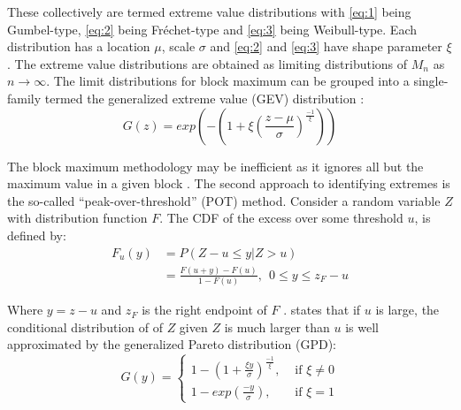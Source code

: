 
These collectively are termed extreme value distributions with \ref{eq:1} being Gumbel-type, \ref{eq:2} being Fr\'echet-type and \ref{eq:3} being Weibull-type. Each distribution has a location $\mu$, scale $\sigma$ and \ref{eq:2} and \ref{eq:3} have shape parameter $\xi$. The extreme value distributions are obtained as limiting distributions of $M_n$ as $n \to \infty$. The limit distributions for block maximum can be grouped into a single-family termed the generalized extreme value (GEV) distribution \citep{dehaan2007extreme}:
\begin{equation}
    G(z) = exp\left(-\left(1+\xi\left(\frac{z-\mu}{\sigma}\right)^{\frac{-1}{\xi}}\right)\right)
    \label{eq:GEV}
\end{equation}

The block maximum methodology may be inefficient as it ignores all but the maximum value in a given block \citep{davison2015statistics}. The second approach to identifying extremes is the so-called ``peak-over-threshold'' (POT) method. Consider a random variable $Z$ with distribution function $F$. The CDF of the excess over some threshold $u$, is defined by:
\begin{equation}
    \begin{aligned}
        F_u(y) & = P(Z - u \leq y | Z > u)                               \\
               & = \frac{F(u+y) - F(u)}{1-F(u)}, \ \ 0 \leq y \leq z_F-u
    \end{aligned}
    \label{eq:exceed}
\end{equation}

Where $y = z - u$ and $z_F$ is the right endpoint of $F$ \citep{gilli2006application}. \cite{pickands1975statistical} states that if $u$ is large, the conditional distribution of of $Z$ given $Z$ is much larger than $u$ is well approximated by the generalized Pareto distribution (GPD):
\begin{equation}
    G(y) =
    \begin{cases}
        1 - \left(1 + \frac{\xi y}{\sigma}\right)^{\frac{-1}{\xi }}, & \text{ if } \xi  \neq 0 \\
        1-exp\left(\frac{-y}{\sigma} \right),                        & \text{ if } \xi  = 1
    \end{cases}
    \label{eq:GPD}
\end{equation}

